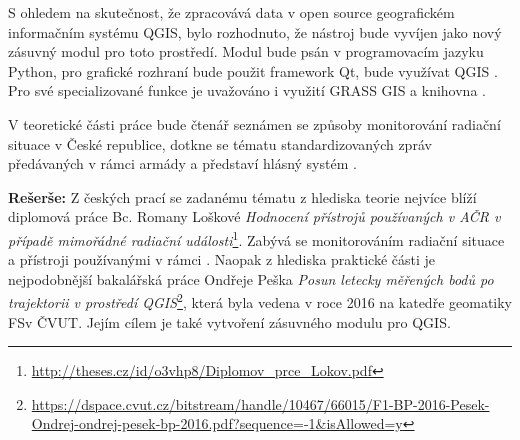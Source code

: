 S ohledem na skutečnost, že  zpracovává data v open source geografickém informačním systému QGIS, bylo rozhodnuto, že nástroj bude vyvíjen jako nový zásuvný modul pro toto prostředí. Modul bude psán v programovacím jazyku Python, pro grafické rozhraní bude použit framework Qt, bude využívat QGIS . Pro své specializované funkce je uvažováno i využití GRASS GIS  a knihovna . 

V teoretické části práce bude čtenář seznámen se způsoby monitorování radiační situace v České republice, dotkne se tématu standardizovaných zpráv předávaných v rámci armády a představí hlásný systém .

\textbf{Rešerše:} Z českých prací se zadanému tématu z hlediska teorie nejvíce blíží diplomová práce Bc. Romany Loškové \textit{Hodnocení přístrojů používaných v AČR v případě mimořádné radiační události}\footnote{\url{http://theses.cz/id/o3vhp8/Diplomov_prce_Lokov.pdf}}. Zabývá se monitorováním radiační situace a přístroji používanými v rámci . Naopak z hlediska praktické části je nejpodobnější bakalářská práce Ondřeje Peška \textit{Posun letecky měřených bodů po trajektorii v prostředí QGIS}\footnote{\url{https://dspace.cvut.cz/bitstream/handle/10467/66015/F1-BP-2016-Pesek-Ondrej-ondrej-pesek-bp-2016.pdf?sequence=-1&isAllowed=y}}, která byla vedena v roce 2016 na katedře geomatiky FSv ČVUT. Jejím cílem je také vytvoření zásuvného modulu pro QGIS.
